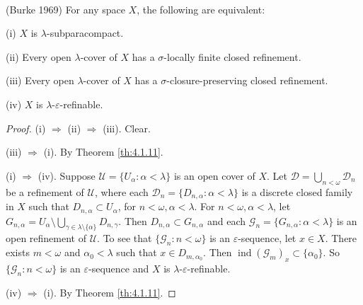\documentclass[main.tex]{subfiles}
\begin{document}
{\theorem{} \label{th:4.1.12}
\textup{(\hstretch{1.8}{[}Burke 1969\hstretch{1.8}{]}\textsuperscript{\cite{Burke}})} 
For any space $X$, the following are equivalent:

\textup{(i)} $X$ is $\lambda$-subparacompact.

\textup{(ii)} Every open $\lambda$-cover of $X$ has a $\sigma$-locally finite closed refinement.

\textup{(iii)} Every open $\lambda$-cover of $X$ has a $\sigma$-closure-preserving closed refinement.

\textup{(iv)} $X$ is $\lambda$-$\varepsilon$-refinable.
}

\begin{proof}
(i) $\Rightarrow$ (ii) $\Rightarrow$ (iii). Clear. 

(iii) $\Rightarrow$ (i). By Theorem \ref{th:4.1.11}.

(i) $\Rightarrow$ (iv).  Suppose $\mathscr{U} = \{U_\alpha: \alpha < \lambda\}$ is an open cover of $X$.
Let $\mathscr{D} = \bigcup_{n < \omega} \mathscr{D}_n$ be a refinement of $\mathscr{U}$,
where each $\mathscr{D}_n = \{D_{n,\alpha}: \alpha < \lambda\}$ is a discrete closed family in $X$ 
such that $D_{n,\alpha}\subset U_\alpha$, for $n < \omega, \alpha < \lambda$.
For $n < \omega, \alpha < \lambda$, let 
$G_{n,\alpha} = U_\alpha \setminus \bigcup_{\gamma \in \lambda\setminus\{\alpha\}} D_{n,\gamma}$. 
Then $D_{n,\alpha} \subset G_{n,\alpha}$ and each 
$\mathscr{G}_n = \{G_{n,\alpha}: \alpha < \lambda\}$ is an open refinement of 
$\mathscr{U}$. To see that $\{\mathscr{G}_n: n < \omega\}$ is an $\varepsilon$-sequence, let $x\in X$.
There exists 
$m < \omega$ and $\alpha_0 < \lambda$ such that $x\in D_{m,\alpha_0}$. Then
$\operatorname{ind}(\mathscr{G}_m)_x\subset \{\alpha_0\}$. 
So $\{\mathscr{G}_n: n < \omega\}$ is an $\varepsilon$-sequence and $X$ is 
$\lambda$-$\varepsilon$-refinable.

(iv) $\Rightarrow$ (i). By Theorem \ref{th:4.1.11}.
\end{proof} 




\end{document}
